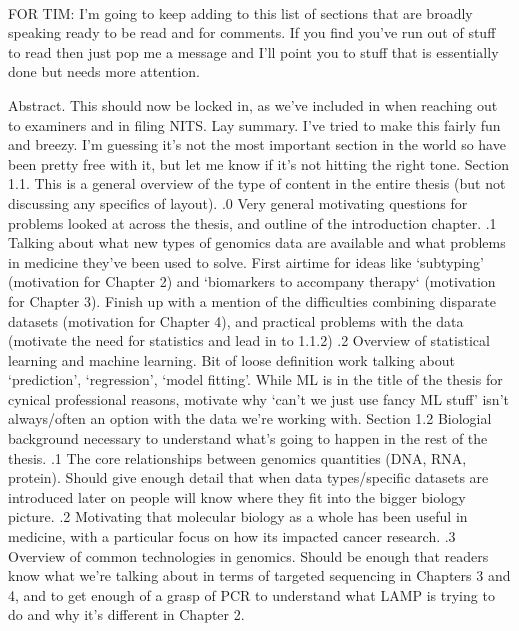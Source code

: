 \documentclass[12pt,twoside,openright]{report}
\theoremstyle{definition}
\begin{document}
\tableofcontents
~\\
{\color{red} FOR TIM:
I'm going to keep adding to this list of sections that are broadly speaking ready to be read and for comments. If you find you've run out of stuff to read then just pop me a message and I'll point you to stuff that is essentially done but needs more attention.
\begin{outline}
    \1 Abstract. This should now be locked in, as we've included in when reaching out to examiners and in filing NITS.
    \1 Lay summary. I've tried to make this fairly fun and breezy. I'm guessing it's not the most important section in the world so have been pretty free with it, but let me know if it's not hitting the right tone.
    \1 Section 1.1. This is a general overview of the type of content in the entire thesis (but not discussing any specifics of layout).
        .0 Very general motivating questions for problems looked at across the thesis, and outline of the introduction chapter.
        .1 Talking about what new types of genomics data are available and what problems in medicine they've been used to solve. First airtime for ideas like `subtyping' (motivation for Chapter 2) and `biomarkers to accompany therapy` (motivation for Chapter 3). Finish up with a mention of the difficulties combining disparate datasets (motivation for Chapter 4), and practical problems with the data (motivate the need for statistics and lead in to 1.1.2)
        .2 Overview of statistical learning and machine learning. Bit of loose definition work talking about `prediction', `regression', `model fitting'. While ML is in the title of the thesis for cynical professional reasons, motivate why `can't we just use fancy ML stuff' isn't always/often an option with the data we're working with.
    \1 Section 1.2 Biologial background necessary to understand what's going to happen in the rest of the thesis.
        .1 The core relationships between genomics quantities (DNA, RNA, protein). Should give enough detail that when data types/specific datasets are introduced later on people will know where they fit into the bigger biology picture.
        .2 Motivating that molecular biology as a whole has been useful in medicine, with a particular focus on how its impacted cancer research.
        .3 Overview of common technologies in genomics. Should be enough that readers know what we're talking about in terms of targeted sequencing in Chapters 3 and 4, and to get enough of a grasp of PCR to understand what LAMP is trying to do and why it's different in Chapter 2.

\end{outline}}
\end{document}
